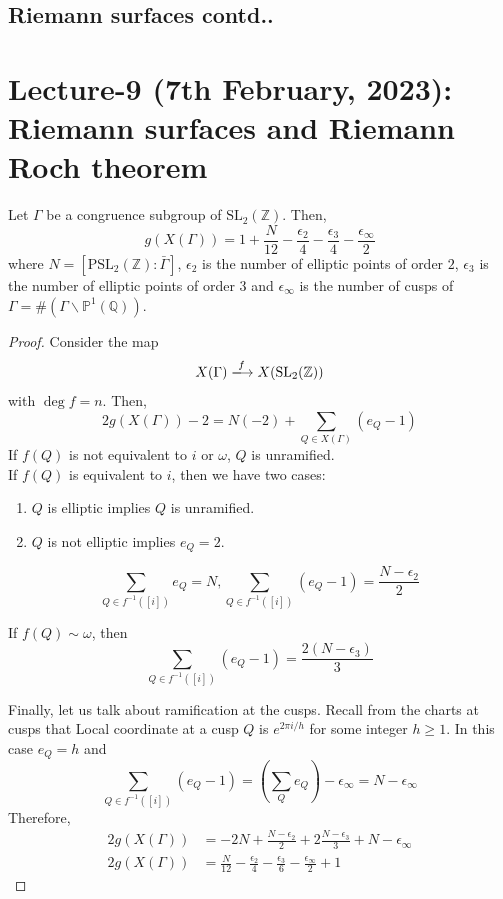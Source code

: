 \documentclass[oneside, 12pt]{scrbook}
\newcommand{\QQ}{\mathbb Q}
\newcommand{\ZZ}{\mathbb Z}
\newcommand{\PP}{\mathbb{P}}
\newcommand{\SL}{\mathrm{SL}}
\newcommand{\bs}{\backslash}
\theoremstyle{theorem}
\begin{document}
\section{Riemann surfaces contd..}


\chapter{Lecture-9 (7th February, 2023): Riemann surfaces and Riemann Roch theorem}

\begin{corollary}
Let $\Gamma$ be a congruence subgroup of $\SL_{2}(\ZZ)$. Then, $$g(X(\Gamma)) = 1 + \frac{N}{12} - \frac{\epsilon_{2}}{4} - \frac{\epsilon_{3}}{4} - \frac{\epsilon_{\infty}}{2}$$ where $N = [\mathrm{PSL}_{2}(\ZZ): \bar{\Gamma}]$, $\epsilon_{2}$ is the number of elliptic points of order $2$, $\epsilon_{3}$ is the number of elliptic points of order $3$ and $\epsilon_{\infty}$ is the number of cusps of $\Gamma = \#(\Gamma \bs \PP^{1}(\QQ))$.
\end{corollary}

\begin{proof}
Consider the map $$X(\Gamma) \xlongrightarrow{f} X(\SL_{2}(\ZZ))$$ with $\deg f = n$. Then, $$2g(X(\Gamma)) -2 = N(-2) + \sum_{Q \in X(\Gamma)} (e_{Q}-1)$$
If $f(Q)$ is not equivalent to $i$ or $\omega$, $Q$ is unramified. \\

If $f(Q)$ is equivalent to $i$, then we have two cases: 
\begin{enumerate}
\item $Q$ is elliptic implies $Q$ is unramified.
\item $Q$ is not elliptic implies $e_{Q}=2$.
\end{enumerate}
$$\sum_{Q \in f^{-1}([i])} e_{Q}=N , \sum_{Q \in f^{-1}([i])} (e_{Q}-1) = \frac{N-\epsilon_{2}}{2}$$

If $f(Q) \sim \omega$, then $$\sum_{Q \in f^{-1}([i])} (e_{Q}-1) = \frac{2(N-\epsilon_{3})}{3}$$

Finally, let us talk about ramification at the cusps. Recall from the charts at cusps that Local coordinate at a cusp $Q$ is $e^{2\pi i /h}$ for some integer $h \geq 1$. In this case $e_{Q}=h$ and $$\sum_{Q \in f^{-1}([i])} (e_{Q}-1) = \left(\sum_{Q}e_{Q}\right) - \epsilon_{\infty} = N - \epsilon_{\infty}$$
Therefore, 
\begin{align*}
2g(X(\Gamma)) &= -2N + \frac{N - \epsilon_{2}}{2} + 2\frac{N-\epsilon_{3}}{3} + N -\epsilon_{\infty} \\
2g(X(\Gamma)) &= \frac{N}{12} - \frac{\epsilon_{2}}{4} - \frac{\epsilon_{3}}{6} - \frac{\epsilon_{\infty}}{2} + 1
\end{align*}
\end{proof}
\end{document}

